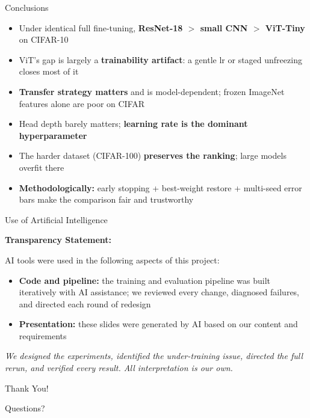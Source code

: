 \documentclass{beamer}
\begin{document}
\begin{frame}{Conclusions}

  \begin{itemize}
    \item Under identical full fine-tuning,
          \textbf{ResNet-18 $>$ small CNN $>$ ViT-Tiny} on CIFAR-10
    \item ViT's gap is largely a \textbf{trainability artifact}: a gentle lr or
          staged unfreezing closes most of it
    \item \textbf{Transfer strategy matters} and is model-dependent;
          frozen ImageNet features alone are poor on CIFAR
    \item Head depth barely matters;
          \textbf{learning rate is the dominant hyperparameter}
    \item The harder dataset (CIFAR-100) \textbf{preserves the ranking};
          large models overfit there
    \item \textbf{Methodologically:} early stopping + best-weight restore +
          multi-seed error bars make the comparison fair and trustworthy
  \end{itemize}


\end{frame}

\begin{frame}{Use of Artificial Intelligence}

  \textbf{Transparency Statement:}

  AI tools were used in the following aspects of this project:
  \begin{itemize}
    \item \textbf{Code and pipeline:} the training and evaluation pipeline was
          built iteratively with AI assistance; we reviewed every change, diagnosed
          failures, and directed each round of redesign
    \item \textbf{Presentation:} these slides were generated by AI based on our
          content and requirements
  \end{itemize}

  \bigskip
  \textit{We designed the experiments, identified the under-training issue,
  directed the full rerun, and verified every result.
  All interpretation is our own.}

\end{frame}

\begin{frame}{Thank You!}

  \begin{center}
    \vspace{1cm}
    \Large Questions?
  \end{center}

\end{frame}
\end{document}
